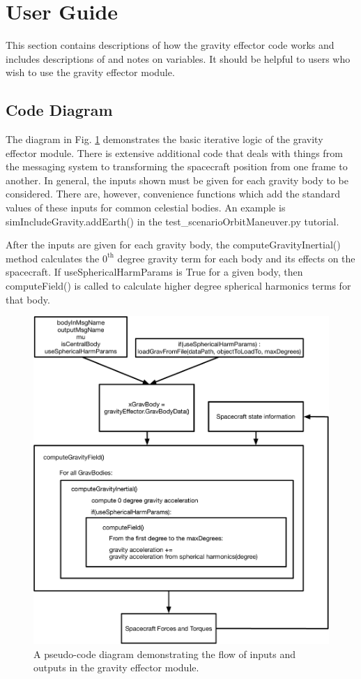 \section{User Guide}
This section contains descriptions of how the gravity effector code works and includes descriptions of and notes on variables. It should be helpful to users who wish to use the gravity effector module.

\subsection{Code Diagram}
The diagram in Fig. \ref{img:codeFlow} demonstrates the basic iterative logic of the gravity effector module. There is extensive additional code that deals with things from the messaging system to transforming the spacecraft position from one frame to another. In general, the inputs shown must be given for each gravity body to be considered. There are, however, convenience functions which add the standard values of these inputs for common celestial bodies. An example is simIncludeGravity.addEarth() in the test\_scenarioOrbitManeuver.py tutorial.

After the inputs are given for each gravity body, the computeGravityInertial() method calculates the $0^{\textrm{th}}$ degree gravity term for each body and its effects on the spacecraft. If useSphericalHarmParams is True for a given body, then computeField() is called to calculate higher degree spherical harmonics terms for that body.

\begin{figure}[H]
	\centering \includegraphics[height=0.8\textwidth, keepaspectratio]{Figures/codeFlow.pdf}
	\caption{A pseudo-code diagram demonstrating the flow of inputs and outputs in the gravity effector module.}
	\label{img:codeFlow}
\end{figure}

